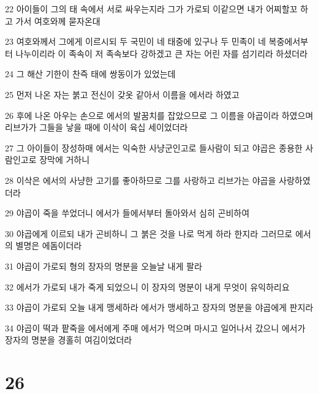 \par 22 아이들이 그의 태 속에서 서로 싸우는지라 그가 가로되 이같으면 내가 어찌할꼬 하고 가서 여호와께 묻자온대
\par 23 여호와께서 그에게 이르시되 두 국민이 네 태중에 있구나 두 민족이 네 복중에서부터 나누이리라 이 족속이 저 족속보다 강하겠고 큰 자는 어린 자를 섬기리라 하셨더라
\par 24 그 해산 기한이 찬즉 태에 쌍동이가 있었는데
\par 25 먼저 나온 자는 붉고 전신이 갖옷 같아서 이름을 에서라 하였고
\par 26 후에 나온 아우는 손으로 에서의 발꿈치를 잡았으므로 그 이름을 야곱이라 하였으며 리브가가 그들을 낳을 때에 이삭이 육십 세이었더라
\par 27 그 아이들이 장성하매 에서는 익숙한 사냥군인고로 들사람이 되고 야곱은 종용한 사람인고로 장막에 거하니
\par 28 이삭은 에서의 사냥한 고기를 좋아하므로 그를 사랑하고 리브가는 야곱을 사랑하였더라
\par 29 야곱이 죽을 쑤었더니 에서가 들에서부터 돌아와서 심히 곤비하여
\par 30 야곱에게 이르되 내가 곤비하니 그 붉은 것을 나로 먹게 하라 한지라 그러므로 에서의 별명은 에돔이더라
\par 31 야곱이 가로되 형의 장자의 명분을 오늘날 내게 팔라
\par 32 에서가 가로되 내가 죽게 되었으니 이 장자의 명분이 내게 무엇이 유익하리요
\par 33 야곱이 가로되 오늘 내게 맹세하라 에서가 맹세하고 장자의 명분을 야곱에게 판지라
\par 34 야곱이 떡과 팥죽을 에서에게 주매 에서가 먹으며 마시고 일어나서 갔으니 에서가 장자의 명분을 경홀히 여김이었더라

\chapter{26}

